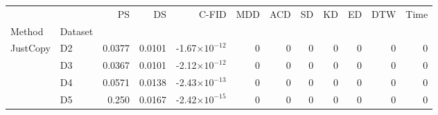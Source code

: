 \begin{tabular}{llrrrrrrrrrr}
{} & {} & {PS} & {DS} & {C-FID} & {MDD} & {ACD} & {SD} & {KD} & {ED} & {DTW} & {Time} \\
{Method} & {Dataset} & {} & {} & {} & {} & {} & {} & {} & {} & {} & {} \\
\multirow[c]{6}{*}{JustCopy} & D2 & \cellcolor[HTML]{398641}\textcolor[HTML]{f1f1f1}{0.0377}& \cellcolor[HTML]{398641}\textcolor[HTML]{f1f1f1}{0.0101}& \cellcolor[HTML]{398641}\textcolor[HTML]{f1f1f1}{-1.67×$10^{-12}$}& \cellcolor[HTML]{398641}\textcolor[HTML]{f1f1f1}{0}& \cellcolor[HTML]{398641}\textcolor[HTML]{f1f1f1}{0}& \cellcolor[HTML]{398641}\textcolor[HTML]{f1f1f1}{0}& \cellcolor[HTML]{398641}\textcolor[HTML]{f1f1f1}{0}& \cellcolor[HTML]{398641}\textcolor[HTML]{f1f1f1}{0}& \cellcolor[HTML]{398641}\textcolor[HTML]{f1f1f1}{0}& \cellcolor[HTML]{398641}\textcolor[HTML]{f1f1f1}{0}\\
 & D3 & \cellcolor[HTML]{398641}\textcolor[HTML]{f1f1f1}{0.0367}& \cellcolor[HTML]{398641}\textcolor[HTML]{f1f1f1}{0.0101}& \cellcolor[HTML]{398641}\textcolor[HTML]{f1f1f1}{-2.12×$10^{-12}$}& \cellcolor[HTML]{398641}\textcolor[HTML]{f1f1f1}{0}& \cellcolor[HTML]{398641}\textcolor[HTML]{f1f1f1}{0}& \cellcolor[HTML]{398641}\textcolor[HTML]{f1f1f1}{0}& \cellcolor[HTML]{398641}\textcolor[HTML]{f1f1f1}{0}& \cellcolor[HTML]{398641}\textcolor[HTML]{f1f1f1}{0}& \cellcolor[HTML]{398641}\textcolor[HTML]{f1f1f1}{0}& \cellcolor[HTML]{398641}\textcolor[HTML]{f1f1f1}{0}\\
 & D4 & \cellcolor[HTML]{398641}\textcolor[HTML]{f1f1f1}{0.0571}& \cellcolor[HTML]{398641}\textcolor[HTML]{f1f1f1}{0.0138}& \cellcolor[HTML]{398641}\textcolor[HTML]{f1f1f1}{-2.43×$10^{-13}$}& \cellcolor[HTML]{398641}\textcolor[HTML]{f1f1f1}{0}& \cellcolor[HTML]{398641}\textcolor[HTML]{f1f1f1}{0}& \cellcolor[HTML]{398641}\textcolor[HTML]{f1f1f1}{0}& \cellcolor[HTML]{398641}\textcolor[HTML]{f1f1f1}{0}& \cellcolor[HTML]{398641}\textcolor[HTML]{f1f1f1}{0}& \cellcolor[HTML]{398641}\textcolor[HTML]{f1f1f1}{0}& \cellcolor[HTML]{398641}\textcolor[HTML]{f1f1f1}{0}\\
 & D5 & \cellcolor[HTML]{df7b98}\textcolor[HTML]{f1f1f1}{0.250}& \cellcolor[HTML]{3c8844}\textcolor[HTML]{f1f1f1}{0.0167}& \cellcolor[HTML]{398641}\textcolor[HTML]{f1f1f1}{-2.42×$10^{-15}$}& \cellcolor[HTML]{398641}\textcolor[HTML]{f1f1f1}{0}& \cellcolor[HTML]{398641}\textcolor[HTML]{f1f1f1}{0}& \cellcolor[HTML]{398641}\textcolor[HTML]{f1f1f1}{0}& \cellcolor[HTML]{398641}\textcolor[HTML]{f1f1f1}{0}& \cellcolor[HTML]{398641}\textcolor[HTML]{f1f1f1}{0}& \cellcolor[HTML]{398641}\textcolor[HTML]{f1f1f1}{0}& \cellcolor[HTML]{398641}\textcolor[HTML]{f1f1f1}{0}\\

\end{tabular}
